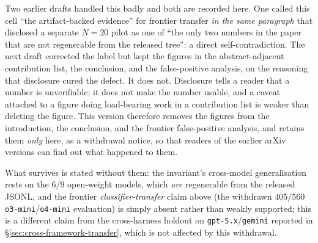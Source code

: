 \documentclass{article}
\begin{document}
Two earlier drafts handled this badly and both are recorded here. One called this cell
``the artifact-backed evidence'' for frontier transfer \emph{in the same paragraph} that
disclosed a separate $N{=}20$ pilot as one of ``the only two numbers in the paper that are
not regenerable from the released tree'': a direct self-contradiction. The next draft
corrected the label but kept the figures in the abstract-adjacent contribution list, the
conclusion, and the false-positive analysis, on the reasoning that disclosure cured the
defect. It does not. Disclosure tells a reader that a number is unverifiable; it does not
make the number usable, and a caveat attached to a figure doing load-bearing work in a
contribution list is weaker than deleting the figure. This version therefore removes the
figures from the introduction, the conclusion, and the frontier false-positive analysis, and
retains them \emph{only} here, as a withdrawal notice, so that readers of the earlier arXiv
versions can find out what happened to them.

What survives is stated without them: the invariant's cross-model generalisation rests on
the $6/9$ open-weight models, which \emph{are} regenerable from the released JSONL, and the
frontier \emph{classifier-transfer} claim above (the withdrawn $405$/$560$ \texttt{o3-mini}/\texttt{o4-mini} evaluation) is simply absent rather than weakly supported; this is a
different claim from the cross-harness holdout on \texttt{gpt-5.x}/\texttt{gemini} reported
in \S\ref{sec:cross-framework-transfer}, which is not affected by this withdrawal.
\end{document}
